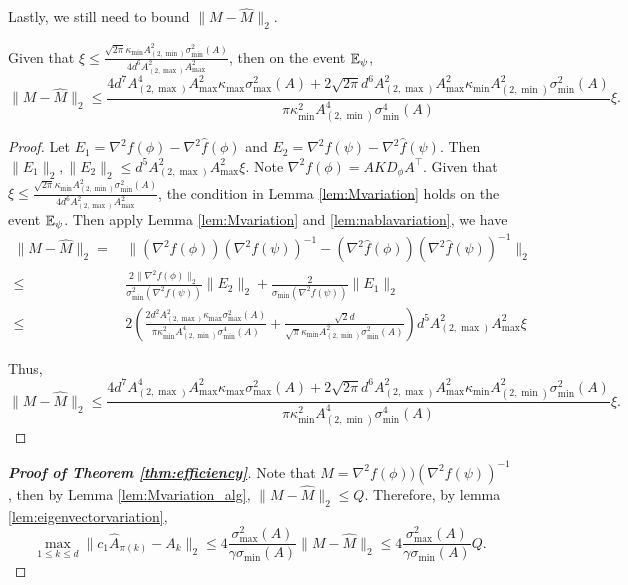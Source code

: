 Lastly, we still need to bound $\|M - \widehat{M}\|_2$.
\begin{lemma}
\label{lem:Mvariation_alg}
Given that $\xi \le \frac{\sqrt{2\pi}\kappa_{\min}A^2_{(2,\min)}\sigma_{\min}^2(A)}{4d^6 A_{(2,\max)}^2A_{\max}^2}$, then on the event $\mathbb{E}_{\psi}$, 
\[ 
\|M - \widehat{M}\|_2 \le \frac{4d^7A_{(2,\max)}^4A_{\max}^2\kappa_{\max}\sigma_{\max}^2(A) + 2\sqrt{2\pi}d^6A_{(2,\max)}^2A_{\max}^2\kappa_{\min}A^2_{(2,\min)}\sigma_{\min}^2(A)}{\pi\kappa^2_{\min}A^4_{(2,\min)}\sigma_{\min}^4(A)} \xi.
\]
\end{lemma}
\begin{proof}
Let $E_1 = \nabla^2 f(\phi) - \nabla^2 \widehat{f}(\phi)$ and $ E_2 = \nabla^2 f(\psi) - \nabla^2 \widehat{f}(\psi)$. Then $\|E_1\|_2 , \|E_2\|_2 \le d^5 A_{(2,\max)}^2A_{\max}^2\xi$.
Note $\nabla^2f(\phi) = AKD_{\phi} A^{\top}$.
Given that $\xi \le  \frac{\sqrt{2\pi}\kappa_{\min}A^2_{(2,\min)}\sigma_{\min}^2(A)}{4d^6 A_{(2,\max)}^2A_{\max}^2}$, the condition in Lemma \ref{lem:Mvariation} holds on the event $\mathbb{E}_{\psi}$. 
Then apply Lemma \ref{lem:Mvariation} and \ref{lem:nablavariation}, we have
\begin{align*}
\|M - \widehat{M}\|_2 =\, & \|(\nabla^2 f(\phi))(\nabla^2f(\psi))^{-1} - (\nabla^2 \widehat{f}(\phi))(\nabla^2\widehat{f}(\psi))^{-1} \|_2 \\
\le \, &\frac{2\|\nabla^2 f(\phi)\|_2}{\sigma_{\min}^2(\nabla^2f(\psi))}\|E_2\|_2 + \frac{2}{\sigma_{\min}(\nabla^2f(\psi))}\|E_1\|_2 \\
\le \, & 2\left( \frac{2d^2A_{(2,\max)}^2\kappa_{\max}\sigma_{\max}^2(A)}{\pi\kappa^2_{\min}A^4_{(2,\min)}\sigma_{\min}^4(A)} + 
\frac{\sqrt{2}d}{\sqrt{\pi}\kappa_{\min}A^2_{(2,\min)}\sigma_{\min}^2(A)}
\right)d^5 A_{(2,\max)}^2A_{\max}^2\xi
\end{align*}

Thus, 
\[ 
\|M - \widehat{M}\|_2 \le \frac{4d^7A_{(2,\max)}^4A_{\max}^2\kappa_{\max}\sigma_{\max}^2(A) + 2\sqrt{2\pi}d^6A_{(2,\max)}^2A_{\max}^2\kappa_{\min}A^2_{(2,\min)}\sigma_{\min}^2(A)}{\pi\kappa^2_{\min}A^4_{(2,\min)}\sigma_{\min}^4(A)} \xi.
\]
\end{proof}
\begin{proof}[{\bf Proof of Theorem  \ref{thm:efficiency}}]
Note that $M = \nabla^2f(\phi))(\nabla^2f(\psi))^{-1}$,  then by Lemma \ref{lem:Mvariation_alg}, $\|M-\widehat{M}\|_2 \le Q$.
Therefore, by lemma \ref{lem:eigenvectorvariation}, 
  \[
  \max_{1\le k\le d}\| c_1\widehat{A}_{\pi(k)} - A_k\|_2 \le 4 \frac{\sigma_{\max}^2(A)}{\gamma \sigma_{\min}(A)}\|M - \widehat{M} \|_2 \le 4 \frac{\sigma_{\max}^2(A)}{\gamma \sigma_{\min}(A)} Q. 
  \]
 
\end{proof}


